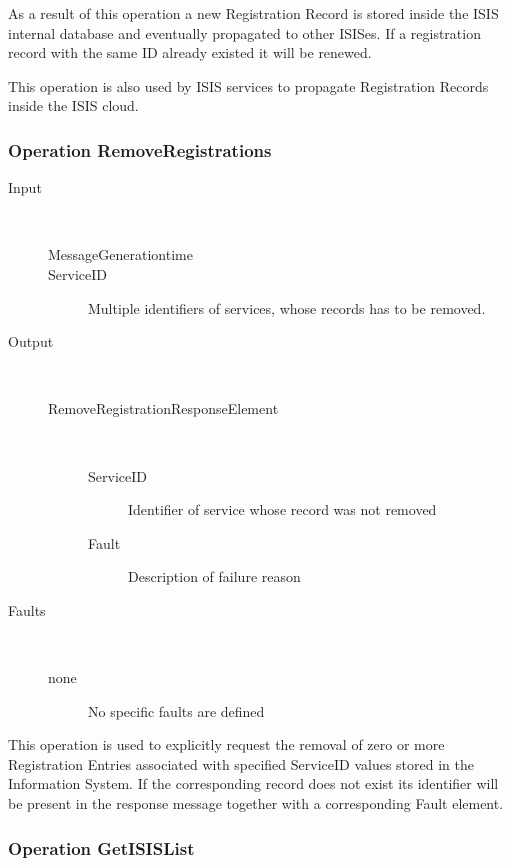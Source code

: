 \documentclass{book}
\begin{document}
As a result of this operation a new Registration Record is stored inside the ISIS internal database and eventually propagated to other ISISes. If a registration record with the same ID already existed it will be renewed.

This operation is also used by ISIS services to propagate Registration Records inside the ISIS cloud.

\subsubsection{Operation RemoveRegistrations}

\begin{description}

  \item[Input]~\begin{description}
    \item[MessageGenerationtime]
    \item[ServiceID] Multiple identifiers of services, whose records has to be removed.
  \end{description}

  \item[Output]~\begin{description}
    \item[RemoveRegistrationResponseElement]~\begin{description}
      \item[ServiceID] Identifier of service whose record was not removed
      \item[Fault] Description of failure reason
    \end{description}
  \end{description}

  \item[Faults]~\begin{description}
    \item[none]No specific faults are defined
  \end{description}

\end{description}

This operation is used to explicitly request the removal of zero or more Registration Entries associated with specified ServiceID values stored in the Information System. If the corresponding record does not exist its identifier will be present in the response message together with a corresponding Fault element.

\subsubsection{Operation GetISISList}
\end{document}
